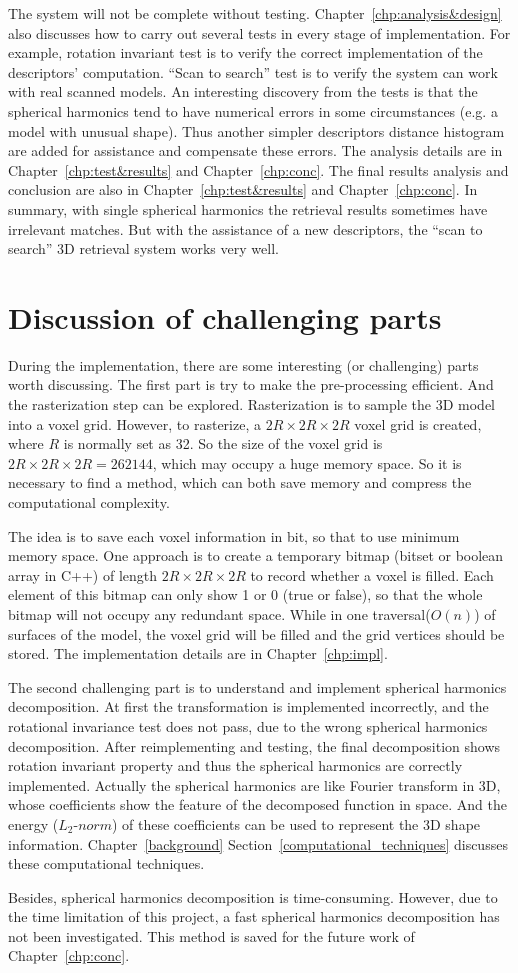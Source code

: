 The system will not be complete without testing. Chapter~\ref{chp:analysis&design} also discusses how to carry out several tests in every stage of implementation. For example, rotation invariant test is to verify the correct implementation of the descriptors' computation. ``Scan to search'' test is to verify the system can work with real scanned models. An interesting discovery from the tests is that the spherical harmonics tend to have numerical errors in some circumstances (e.g. a model with unusual shape). Thus another simpler descriptors distance histogram are added for assistance and compensate these errors. The analysis details are in Chapter~\ref{chp:test&results} and Chapter~\ref{chp:conc}. The final results analysis and conclusion are also in Chapter~\ref{chp:test&results} and Chapter~\ref{chp:conc}. In summary, with single spherical harmonics the retrieval results sometimes have irrelevant matches. But with the assistance of a new descriptors, the ``scan to search'' 3D retrieval system works very well. 

\section{Discussion of challenging parts}

During the implementation, there are some interesting (or challenging) parts worth discussing. The first part is try to make the pre-processing efficient. And the rasterization step can be explored. Rasterization is to sample the 3D model into a voxel grid. However, to rasterize, a $2R\times2R\times2R$ voxel grid is created, where $R$ is normally set as 32. So the size of the voxel grid is $2R\times2R\times2R = 262144$, which may occupy a huge memory space. So it is necessary to find a method, which can both save memory and compress the computational complexity. 

The idea is to save each voxel information in bit, so that to use minimum memory space. One approach is to create a temporary bitmap (bitset or boolean array in C++) of length $2R\times2R\times2R$ to record whether a voxel is filled. Each element of this bitmap can only show 1 or 0 (true or false), so that the whole bitmap will not occupy any redundant space. While in one traversal($O(n)$) of surfaces of the model, the voxel grid will be filled and the grid vertices should be stored. The implementation details are in Chapter~\ref{chp:impl}. 

The second challenging part is to understand and implement spherical harmonics decomposition. At first the transformation is implemented incorrectly, and the rotational invariance test does not pass, due to the wrong spherical harmonics decomposition. After reimplementing and testing, the final decomposition shows rotation invariant property and thus the spherical harmonics are correctly implemented.  Actually the spherical harmonics are like Fourier transform in 3D, whose coefficients show the feature of the decomposed function in space. And the energy ($L_{2}$-$norm$) of these coefficients can be used to represent the 3D shape information. Chapter~\ref{background} Section~\ref{computational_techniques} discusses these computational techniques.

Besides, spherical harmonics decomposition is time-consuming. However, due to the time limitation of this project, a fast spherical harmonics decomposition has not been investigated. This method is saved for the future work of Chapter~\ref{chp:conc}.